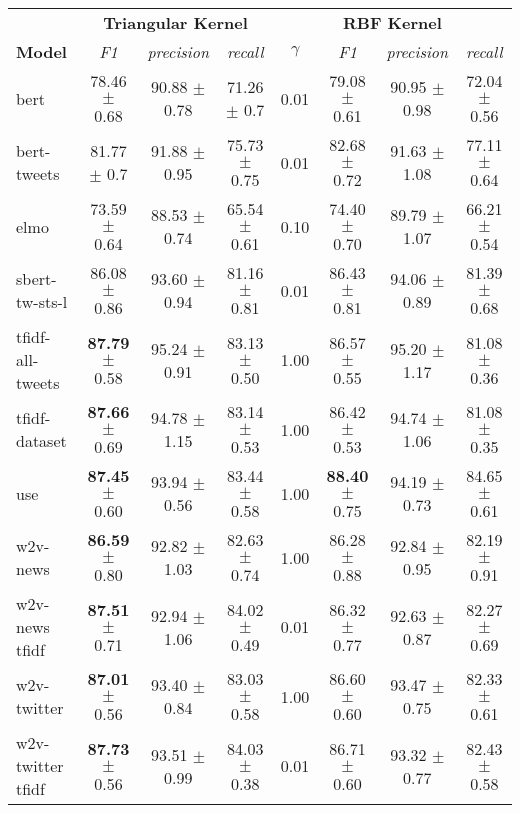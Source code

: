 \begin{tabular}{|l|ccc|cccc|}
\hline
\rowcolor{gray!25}
                           &\multicolumn{3}{c}{\textbf{Triangular Kernel}}&\multicolumn{4}{|c|}{\textbf{RBF Kernel}}\\
\cline{2-8}\textbf{Model}&\textit{F1} &  \textit{precision} &  \textit{recall} & $\gamma$ &       \textit{F1} &\textit{precision} &\textit{recall} \\
\hline
             bert  &  78.46 $\pm$ 0.68 &   90.88 $\pm$ 0.78 &   71.26 $\pm$ 0.7 &     0.01 &  79.08 $\pm$ 0.61 &   90.95 $\pm$ 0.98 &  72.04 $\pm$ 0.56 \\
      bert-tweets  &   81.77 $\pm$ 0.7 &   91.88 $\pm$ 0.95 &  75.73 $\pm$ 0.75 &     0.01 &  82.68 $\pm$ 0.72 &   91.63 $\pm$ 1.08 &  77.11 $\pm$ 0.64 \\
             elmo  &  73.59 $\pm$ 0.64 &   88.53 $\pm$ 0.74 &  65.54 $\pm$ 0.61 &     0.10 &  74.40 $\pm$ 0.70 &   89.79 $\pm$ 1.07 &  66.21 $\pm$ 0.54 \\
   sbert-tw-sts-l  &  86.08 $\pm$ 0.86 &   93.60 $\pm$ 0.94 &  81.16 $\pm$ 0.81 &     0.01 &  86.43 $\pm$ 0.81 &   94.06 $\pm$ 0.89 &  81.39 $\pm$ 0.68 \\
 tfidf-all-tweets  &  \textbf{87.79} $\pm$ 0.58 &   95.24 $\pm$ 0.91 &  83.13 $\pm$ 0.50 &     1.00 &  86.57 $\pm$ 0.55 &   95.20 $\pm$ 1.17 &  81.08 $\pm$ 0.36 \\
    tfidf-dataset  &  \textbf{87.66} $\pm$ 0.69 &   94.78 $\pm$ 1.15 &  83.14 $\pm$ 0.53 &     1.00 &  86.42 $\pm$ 0.53 &   94.74 $\pm$ 1.06 &  81.08 $\pm$ 0.35 \\
              use  &  \textbf{87.45} $\pm$ 0.60 &   93.94 $\pm$ 0.56 &  83.44 $\pm$ 0.58 &     1.00 &  \textbf{88.40} $\pm$ 0.75 &   94.19 $\pm$ 0.73 &  84.65 $\pm$ 0.61 \\
         w2v-news  &  \textbf{86.59} $\pm$ 0.80 &   92.82 $\pm$ 1.03 &  82.63 $\pm$ 0.74 &     1.00 &  86.28 $\pm$ 0.88 &   92.84 $\pm$ 0.95 &  82.19 $\pm$ 0.91 \\
    w2v-news tfidf &  \textbf{87.51} $\pm$ 0.71 &   92.94 $\pm$ 1.06 &  84.02 $\pm$ 0.49 &     0.01 &  86.32 $\pm$ 0.77 &   92.63 $\pm$ 0.87 &  82.27 $\pm$ 0.69 \\
      w2v-twitter  &  \textbf{87.01} $\pm$ 0.56 &   93.40 $\pm$ 0.84 &  83.03 $\pm$ 0.58 &     1.00 &  86.60 $\pm$ 0.60 &   93.47 $\pm$ 0.75 &  82.33 $\pm$ 0.61 \\
 w2v-twitter tfidf &  \textbf{87.73} $\pm$ 0.56 &   93.51 $\pm$ 0.99 &  84.03 $\pm$ 0.38 &     0.01 &  86.71 $\pm$ 0.60 &   93.32 $\pm$ 0.77 &  82.43 $\pm$ 0.58 \\
\hline
\end{tabular}
